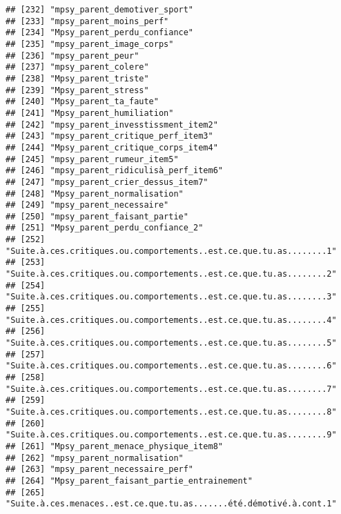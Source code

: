 \documentclass[
]{article}
\begin{document}
\begin{verbatim}
## [232] "mpsy_parent_demotiver_sport"                                       
## [233] "mpsy_parent_moins_perf"                                            
## [234] "Mpsy_parent_perdu_confiance"                                       
## [235] "mpsy_parent_image_corps"                                           
## [236] "mpsy_parent_peur"                                                  
## [237] "mpsy_parent_colere"                                                
## [238] "Mpsy_parent_triste"                                                
## [239] "Mpsy_parent_stress"                                                
## [240] "Mpsy_parent_ta_faute"                                              
## [241] "Mpsy_parent_humiliation"                                           
## [242] "mpsy_parent_invesstissment_item2"                                  
## [243] "mpsy_parent_critique_perf_item3"                                   
## [244] "Mpsy_parent_critique_corps_item4"                                  
## [245] "mpsy_parent_rumeur_item5"                                          
## [246] "mpsy_parent_ridiculisà_perf_item6"                                 
## [247] "mpsy_parent_crier_dessus_item7"                                    
## [248] "Mpsy_parent_normalisation"                                         
## [249] "mpsy_parent_necessaire"                                            
## [250] "mpsy_parent_faisant_partie"                                        
## [251] "Mpsy_parent_perdu_confiance_2"                                     
## [252] "Suite.à.ces.critiques.ou.comportements..est.ce.que.tu.as........1" 
## [253] "Suite.à.ces.critiques.ou.comportements..est.ce.que.tu.as........2" 
## [254] "Suite.à.ces.critiques.ou.comportements..est.ce.que.tu.as........3" 
## [255] "Suite.à.ces.critiques.ou.comportements..est.ce.que.tu.as........4" 
## [256] "Suite.à.ces.critiques.ou.comportements..est.ce.que.tu.as........5" 
## [257] "Suite.à.ces.critiques.ou.comportements..est.ce.que.tu.as........6" 
## [258] "Suite.à.ces.critiques.ou.comportements..est.ce.que.tu.as........7" 
## [259] "Suite.à.ces.critiques.ou.comportements..est.ce.que.tu.as........8" 
## [260] "Suite.à.ces.critiques.ou.comportements..est.ce.que.tu.as........9" 
## [261] "Mpsy_parent_menace_physique_item8"                                 
## [262] "mpsy_parent_normalisation"                                         
## [263] "mpsy_parent_necessaire_perf"                                       
## [264] "Mpsy_parent_faisant_partie_entrainement"                           
## [265] "Suite.à.ces.menaces..est.ce.que.tu.as.......été.démotivé.à.cont.1" 

\end{verbatim}
\end{document}

